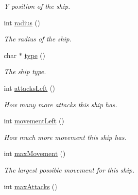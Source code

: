 \begin{DoxyCompactItemize}
\begin{DoxyCompactList}\small\item\em \-Y position of the ship. \end{DoxyCompactList}\item 
\hypertarget{classShip_a967cf1ca3e8216e7cbe2a8323c9efd89}{int \hyperlink{classShip_a967cf1ca3e8216e7cbe2a8323c9efd89}{radius} ()}\label{classShip_a967cf1ca3e8216e7cbe2a8323c9efd89}

\begin{DoxyCompactList}\small\item\em \-The radius of the ship. \end{DoxyCompactList}\item 
\hypertarget{classShip_a99a4ac27b9cfcf9c52d835d9140d7a5f}{char $\ast$ \hyperlink{classShip_a99a4ac27b9cfcf9c52d835d9140d7a5f}{type} ()}\label{classShip_a99a4ac27b9cfcf9c52d835d9140d7a5f}

\begin{DoxyCompactList}\small\item\em \-The ship type. \end{DoxyCompactList}\item 
\hypertarget{classShip_a5ec576d7737143f5c8063dda50018a04}{int \hyperlink{classShip_a5ec576d7737143f5c8063dda50018a04}{attacks\-Left} ()}\label{classShip_a5ec576d7737143f5c8063dda50018a04}

\begin{DoxyCompactList}\small\item\em \-How many more attacks this ship has. \end{DoxyCompactList}\item 
\hypertarget{classShip_a7613e005745562b00581a91ccb94e400}{int \hyperlink{classShip_a7613e005745562b00581a91ccb94e400}{movement\-Left} ()}\label{classShip_a7613e005745562b00581a91ccb94e400}

\begin{DoxyCompactList}\small\item\em \-How much more movement this ship has. \end{DoxyCompactList}\item 
\hypertarget{classShip_af6711249ba8a1262abfaeb3deefa4eae}{int \hyperlink{classShip_af6711249ba8a1262abfaeb3deefa4eae}{max\-Movement} ()}\label{classShip_af6711249ba8a1262abfaeb3deefa4eae}

\begin{DoxyCompactList}\small\item\em \-The largest possible movement for this ship. \end{DoxyCompactList}\item 
\hypertarget{classShip_a89283272eda2ad35076ec2df440c2c9b}{int \hyperlink{classShip_a89283272eda2ad35076ec2df440c2c9b}{max\-Attacks} ()}\label{classShip_a89283272eda2ad35076ec2df440c2c9b}


\end{DoxyCompactItemize}
